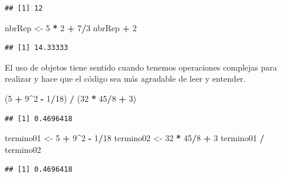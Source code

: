 \documentclass[
]{book}
\newenvironment{Shaded}{\begin{snugshade}}{\end{snugshade}}
\newcommand{\DecValTok}[1]{\textcolor[rgb]{0.00,0.00,0.81}{#1}}
\newcommand{\NormalTok}[1]{#1}
\newcommand{\OperatorTok}[1]{\textcolor[rgb]{0.81,0.36,0.00}{\textbf{#1}}}
\newcommand{\StringTok}[1]{\textcolor[rgb]{0.31,0.60,0.02}{#1}}
\begin{document}
\begin{verbatim}
## [1] 12
\end{verbatim}

\begin{Shaded}
\begin{Highlighting}[]
\NormalTok{nbrRep <-}\StringTok{ }\DecValTok{5} \OperatorTok{*}\StringTok{ }\DecValTok{2} \OperatorTok{+}\StringTok{ }\DecValTok{7}\OperatorTok{/}\DecValTok{3}
\NormalTok{nbrRep }\OperatorTok{+}\StringTok{ }\DecValTok{2}
\end{Highlighting}
\end{Shaded}

\begin{verbatim}
## [1] 14.33333
\end{verbatim}

El uso de objetos tiene sentido cuando tenemos operaciones complejas para realizar y hace que el código sea más agradable de leer y entender.

\begin{Shaded}
\begin{Highlighting}[]
\NormalTok{(}\DecValTok{5} \OperatorTok{+}\StringTok{ }\DecValTok{9}\OperatorTok{^}\DecValTok{2} \OperatorTok{-}\StringTok{ }\DecValTok{1}\OperatorTok{/}\DecValTok{18}\NormalTok{) }\OperatorTok{/}\StringTok{ }\NormalTok{(}\DecValTok{32} \OperatorTok{*}\StringTok{ }\DecValTok{45}\OperatorTok{/}\DecValTok{8} \OperatorTok{+}\StringTok{ }\DecValTok{3}\NormalTok{)}
\end{Highlighting}
\end{Shaded}

\begin{verbatim}
## [1] 0.4696418
\end{verbatim}

\begin{Shaded}
\begin{Highlighting}[]
\NormalTok{termino01 <-}\StringTok{ }\DecValTok{5} \OperatorTok{+}\StringTok{ }\DecValTok{9}\OperatorTok{^}\DecValTok{2} \OperatorTok{-}\StringTok{ }\DecValTok{1}\OperatorTok{/}\DecValTok{18}
\NormalTok{termino02 <-}\StringTok{ }\DecValTok{32} \OperatorTok{*}\StringTok{ }\DecValTok{45}\OperatorTok{/}\DecValTok{8} \OperatorTok{+}\StringTok{ }\DecValTok{3}
\NormalTok{termino01 }\OperatorTok{/}\StringTok{ }\NormalTok{termino02}
\end{Highlighting}
\end{Shaded}

\begin{verbatim}
## [1] 0.4696418
\end{verbatim}
\end{document}
